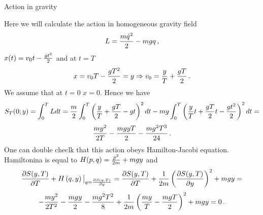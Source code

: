 



\baselineskip=14pt
\def\vare {\varepsilon}
\def\t {\tilde}
\def\a {\alpha}
\def\K {{\bf K}}
\def\N {{\bf N}}
\def\C {{\bf C}}
\def\L {{\cal L}}
\def\E {{\bf E}}
\def\s {{\sigma}}
\def\S {{\Sigma}}
\def\p{\partial}
\def\vare{{\varepsilon}}
\def\Q {{\bf Q}}
\def\D {{\cal D}}
\def\G {{\Gamma}}
\def\Z {{\bf Z}}
\def\R  {{\bf R}}
\def\l {\lambda}
\def\ll {{\bf l}}
\def\degree {{\bf {\rm degree}\,\,}}
\def \finish {${\,\,\vrule height1mm depth2mm width 8pt}$}
\def \m {\medskip}
\def\p {\partial}
\def\r {{\bf r}}
\def\pt {{\bf p}}
\def\v {{\bf v}}
\def\n {{\bf n}}
\def\t {{\bf t}}
\def\b {{\bf b}}
\def\c {{\bf c }}
\def\e{{\bf e}}
\def\f{{\bf f}}
\def\ac {{\bf a}}
\def \X   {{\bf X}}
\def \Y   {{\bf Y}}
\def \x   {{\bf x}}
\def \y   {{\bf y}}
\def\w {{\omega}}
\def \Tr  {{\rm Tr\,}}
\def\dim {{\rm dim\,\,}}
\def\t {{\tilde}} 
\def\dist {{\hbox{\tt "distance"}}}
\def  \dim {{\rm dim\,}}
\def  \Im  {{\rm Im\,}}
\def  \ker {{\rm ker\,}}


\def \Cl {\hbox{\tt Cliff}}

\centerline {Action in gravity}

   Here we will calculate the action in homogeneous gravity field
   $$
 L={m{\dot q}^2\over 2}-mgq\,,
  $$
 $x(t)=v_0t-{gt^2\over 2}$  and at $t=T$
         $$
x=v_0T-{gT^2\over 2}=y\Rightarrow v_0={y\over T}+{gT\over 2}\,.
         $$
We assume that at $t=0$  $x=0$.
  Hence we have
             $$
   S_T(0;y)=\int_0^T Ldt=
{m\over 2}\int_0^T 
\left({y\over T}+{gT\over 2}-gt\right)^2dt
                         -
               {mg}\int_0^T 
\left({y\over T}t+{gT\over 2}t-{gt^2\over 2}\right)^2dt=
             $$
     $$
{my^2\over 2T}-{mgyT\over 2}-{mg^2T^3\over 24}\,.
      $$
One can double checlk that this action 
obeys Hamilton-Jacobi equation.
Hamiltonina is equal to $H(p,q)={p^2\over 2m}+mgy$ and
                 $$
   {\p S(y,T)\over \p T}+H
              \left(
    q,y
          \right)\big\vert_
{q={\p S(y,T)\over \p y}}
           =
   {\p S(y,T)\over \p T}+
             {1\over 2m} 
            \left(
          {\p S(y,T)\over \p y}
             \right)^2+mgy=
        $$
     $$
-{my^2\over 2T^2}-{mgy\over 2}-{mg^2T^2\over 8}+
{1\over 2m}\left({my\over T}-{mgT\over 2}\right)^2
+mgy=0\,.
      $$
\def\S {{\cal S}}

